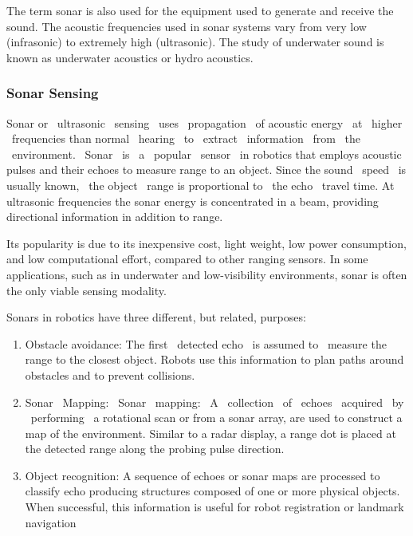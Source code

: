 \documentclass[11pt]{report}
\begin{document}
{
The term sonar is also used for the equipment used to generate and
receive the sound. The acoustic frequencies used in sonar systems vary
from very low (infrasonic) to extremely high (ultrasonic). The study of
underwater sound is known as underwater acoustics or hydro acoustics.

\subsubsection{Sonar Sensing}
{
Sonar or \ ultrasonic \ sensing \ uses \ propagation \ of acoustic
energy \ at \ higher \ frequencies than normal \ hearing \ to \ extract
\ information \ from \ the \ environment. \ Sonar \ is \ a \ popular
\ sensor \ in robotics that employs acoustic pulses and their echoes to
measure range to an object. Since the sound \ speed \ is usually known,
\ the object \ range is proportional to \ the echo \ travel time. At
ultrasonic frequencies the sonar energy is concentrated in a beam,
providing directional information in addition to range.}


{
Its popularity is due to its inexpensive cost, light weight, low power
consumption, and low computational effort, compared to other ranging
sensors. In some applications, such as in underwater and
low{}-visibility environments, sonar is often the only viable sensing
modality.}



{
Sonars in robotics have three different, but related, purposes:}



\begin{enumerate}


\item Obstacle avoidance: The first \ detected echo \ is assumed to
\ measure the range to the closest object. Robots use this information
to plan paths around obstacles and to prevent collisions.

\item  Sonar \ Mapping: \ Sonar \ mapping: \ A \ collection \ of \ echoes
\ acquired \ by \ performing \ a rotational scan or from a sonar array,
are used to construct a map of the environment. Similar to a radar
display, a range dot is placed at the detected range along the probing
pulse direction.

\item Object recognition: A sequence of echoes or sonar maps are processed
to classify echo producing structures composed of one or more physical
objects. When successful, this information is useful for robot
registration or landmark navigation
\end{enumerate}


}
\end{document}
